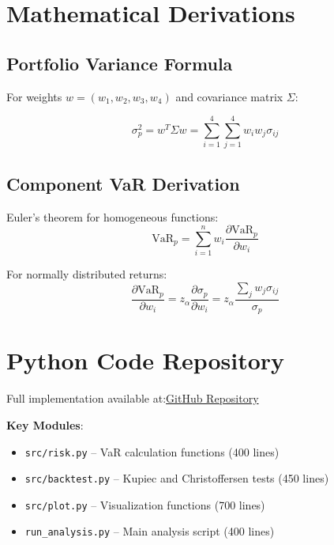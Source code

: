 \documentclass[12pt,a4paper]{article}
\begin{document}
\section{Mathematical Derivations}

\subsection{Portfolio Variance Formula}

For weights $w = (w_1, w_2, w_3, w_4)$ and covariance matrix $\Sigma$:

\begin{equation}
\sigma_p^2 = w^T \Sigma w = \sum_{i=1}^4 \sum_{j=1}^4 w_i w_j \sigma_{ij}
\end{equation}

\subsection{Component VaR Derivation}

Euler's theorem for homogeneous functions:
\begin{equation}
\text{VaR}_p = \sum_{i=1}^n w_i \frac{\partial \text{VaR}_p}{\partial w_i}
\end{equation}

For normally distributed returns:
\begin{equation}
\frac{\partial \text{VaR}_p}{\partial w_i} = z_\alpha \frac{\partial \sigma_p}{\partial w_i} = z_\alpha \frac{\sum_j w_j \sigma_{ij}}{\sigma_p}
\end{equation}

\section{Python Code Repository}

Full implementation available at:\href{https://github.com/zaid282802/Portfolio-Value-at-Risk-Analysis.git}{GitHub Repository}


\textbf{Key Modules}:
\begin{itemize}
    \item \texttt{src/risk.py} – VaR calculation functions (400 lines)
    \item \texttt{src/backtest.py} – Kupiec and Christoffersen tests (450 lines)
    \item \texttt{src/plot.py} – Visualization functions (700 lines)
    \item \texttt{run\_analysis.py} – Main analysis script (400 lines)
\end{itemize}
\end{document}
